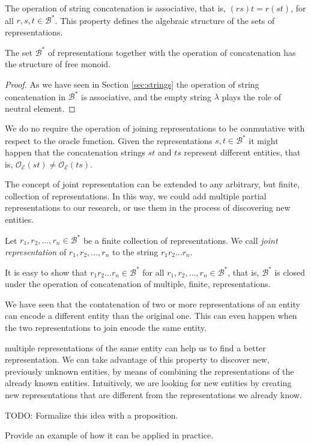 The operation of string concatenation is associative, that is, $(rs)t = r(st)$, for all $r, s, t \in \mathcal{B}^\ast$. This property defines the algebraic structure of the sets of representations.

\begin{proposition}
The set $\mathcal{B}^\ast$ of representations together with the operation of concatenation has the structure of free monoid.
\end{proposition}
\begin{proof}
As we have seen in Section \ref{sec:strings} the operation of string concatenation in $\mathcal{B}^\ast$ is associative, and the empty string $\lambda$ plays the role of neutral element.
\end{proof}

We do no require the operation of joining representations to be conmutative with respect to the oracle function. Given the representations $s, t \in \mathcal{B}^\ast$ it might happen that the concatenation strings $st$ and $ts$ represent different entities, that is, $\mathcal{O}_\mathcal{E} \left( st \right) \neq \mathcal{O}_\mathcal{E} \left( ts \right)$.

The concept of joint representation can be extended to any arbitrary, but finite, collection of representations. In this way, we could add multiple partial representations to our research, or use them in the process of discovering new entities.

\begin{definition}
Let $r_1, r_2, \ldots, r_n \in \mathcal{B}^\ast$ be a finite collection of representations. We call \emph{joint representation} of $r_1, r_2, \ldots, r_n$ to the string $r_1 r_2 \ldots r_n$.
\end{definition}

It is easy to show that $r_1 r_2 \ldots r_n \in \mathcal{B}^\ast$ for all $r_1, r_2, \ldots, r_n \in \mathcal{B}^\ast$, that is, $\mathcal{B}^\ast$ is closed under the operation of concatenation of multiple, finite, representations.

{\color{red}

We have seen that the contatenation of two or more representations of an entity can encode a different entity than the original one. This can even happen when the two representations to join encode the same entity.

multiple representations of the same entity can help us to find a better representation. We can take advantage of this property to discover new, previously unknown entities, by means of combining the representations of the already known entities. Intuitively, we are looking for new entities by creating new representations that are different from the representations we already know.

TODO: Formalize this idea with a proposition.

Provide an example of how it can be applied in practice.

}

